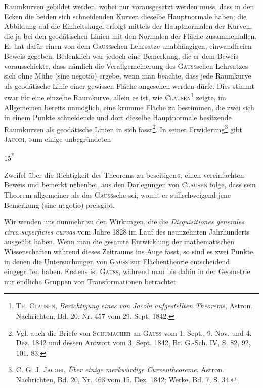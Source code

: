 Raumkurven gebildet werden, wobei nur vorausgesetzt werden muss,
dass in den Ecken die beiden sich schneidenden Kurven dieselbe Hauptnormale
haben; die Abbildung auf die Einheitskugel erfolgt mittels der Hauptnormalen
der Kurven, die ja bei den geodätischen Linien mit den Normalen der Fläche
zusammenfallen. Er hat dafür einen von dem \textsc{Gauss}schen Lehrsatze unabhängigen,
einwandfreien Beweis gegeben. Bedenklich war jedoch eine Bemerkung,
die er dem Beweis vorausschickte, dass nämlich die Verallgemeinerung
des \textsc{Gauss}schen Lehrsatzes sich ohne Mühe (sine negotio) ergebe, wenn man
beachte, dass jede Raumkurve als geodätische Linie einer gewissen Fläche
angesehen werden dürfe. Dies stimmt zwar für eine einzelne Raumkurve,
allein es ist, wie \textsc{Clausen}\footnote{\textsc{Th. Clausen}, \textit{Berichtigung eines von Jacobi aufgestellten Theorems}, Astron. Nachrichten, Bd. 20, Nr. 457 vom 29. Sept. 1842.} zeigte, im Allgemeinen bereits unmöglich, eine
krumme Fläche zu bestimmen, die zwei sich in einem Punkte schneidende
und dort dieselbe Hauptnormale besitzende Raumkurven als geodätische Linien
in sich fasst\footnote{Vgl. auch die Briefe von \textsc{Schumacher} an \textsc{Gauss} vom 1. Sept., 9. Nov. und 4. Dez. 1842 und dessen Antwort vom 3. Sept. 1842, Br. G.-Sch. IV, S. 82, 92, 101, 83.}. In seiner Erwiderung\footnote{\textsc{C. G. J. Jacobi}, \textit{Über einige merkwürdige Curventheoreme}, Astron. Nachrichten, Bd. 20, Nr. 463 vom 15. Dez. 1842; Werke, Bd. 7, S. 34.} gibt \textsc{Jacobi}, »um einige unbegründeten
\par\smallskip\noindent\hfill{\small 15\textsuperscript{*}}\par
\clearpage{}\setcounter{footnote}{0}
\noindent Zweifel über die Richtigkeit des Theorems zu beseitigen«, einen vereinfachten
Beweis und bemerkt nebenbei, aus den Darlegungen von \textsc{Clausen} folge, dass
sein Theorem allgemeiner als das \textsc{Gauss}sche sei, womit er stillschweigend jene
Bemerkung (sine negotio) preisgibt.
\par
Wir wenden uns nunmehr zu den Wirkungen, die die \textit{Disquisitiones
generales circa superficies curvas} vom Jahre 1828 im Lauf des neunzehnten
Jahrhunderts ausgeübt haben. Wenn man die gesamte Entwicklung der
mathematischen Wissenschaften während dieses Zeitraums ins Auge fasst, so
sind es zwei Punkte, in denen die Untersuchungen von \textsc{Gauss} zur Flächentheorie
entscheidend eingegriffen haben. Erstens ist \textsc{Gauss}, während man bis
dahin in der Geometrie nur endliche Gruppen von Transformationen betrachtet
